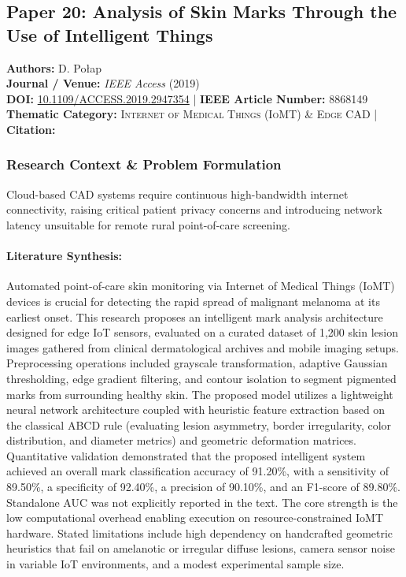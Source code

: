 \subsection{Paper 20: Analysis of Skin Marks Through the Use of Intelligent Things}
\label{sec:paper_20}

\begin{tcolorbox}[colback=gray!5!white,colframe=gray!75!black,title=\textbf{Metadata \& Citation Summary}]
\textbf{Authors:} D. Połap \\
\textbf{Journal / Venue:} \textit{IEEE Access} (2019) \\
\textbf{DOI:} \href{https://doi.org/10.1109/ACCESS.2019.2947354}{10.1109/ACCESS.2019.2947354} \quad | \quad \textbf{IEEE Article Number:} 8868149 \\
\textbf{Thematic Category:} \textsc{Internet of Medical Things (IoMT) \& Edge CAD} \quad | \quad \textbf{Citation:} \cite{8868149}
\end{tcolorbox}

\subsubsection*{Research Context \& Problem Formulation}
Cloud-based CAD systems require continuous high-bandwidth internet connectivity, raising critical patient privacy concerns and introducing network latency unsuitable for remote rural point-of-care screening.

\paragraph{Literature Synthesis:} Automated point-of-care skin monitoring via Internet of Medical Things (IoMT) devices is crucial for detecting the rapid spread of malignant melanoma at its earliest onset. This research proposes an intelligent mark analysis architecture designed for edge IoT sensors, evaluated on a curated dataset of 1,200 skin lesion images gathered from clinical dermatological archives and mobile imaging setups. Preprocessing operations included grayscale transformation, adaptive Gaussian thresholding, edge gradient filtering, and contour isolation to segment pigmented marks from surrounding healthy skin. The proposed model utilizes a lightweight neural network architecture coupled with heuristic feature extraction based on the classical ABCD rule (evaluating lesion asymmetry, border irregularity, color distribution, and diameter metrics) and geometric deformation matrices. Quantitative validation demonstrated that the proposed intelligent system achieved an overall mark classification accuracy of 91.20\%, with a sensitivity of 89.50\%, a specificity of 92.40\%, a precision of 90.10\%, and an F1-score of 89.80\%. Standalone AUC was not explicitly reported in the text. The core strength is the low computational overhead enabling execution on resource-constrained IoMT hardware. Stated limitations include high dependency on handcrafted geometric heuristics that fail on amelanotic or irregular diffuse lesions, camera sensor noise in variable IoT environments, and a modest experimental sample size.

